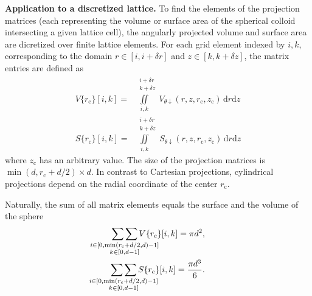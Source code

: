 \documentclass[10pt, a4paper, twocolumn]{article}
\begin{document}
\bigskip\noindent
\textbf{Application to a discretized lattice.}
To find the elements of the projection matrices (each representing the volume or surface area of the spherical colloid intersecting a given lattice cell), the angularly projected volume and surface area are dicretized over finite lattice elements.
For each grid element indexed by $i, k$, corresponding to the domain $r \in [i, i + \delta r]$ and $z \in [k, k + \delta z]$, the matrix entries are defined as
\begin{eqnarray}
    V\{r_{\text{c}}\}{[i, k]} = \! \iint \limits_{i, k}^{\quad \substack{i+\delta r\\ k+\delta z}} \! V_{\theta \downarrow} (r, z, r_{\text{c}}, z_{\text{c}})\, \text{d}r \text{d}z
    \\
    S\{r_{\text{c}}\}{[i, k]} = \! \iint \limits_{i, k}^{\quad \substack{i+\delta r\\ k+\delta z}} \! S_{\theta \downarrow} (r, z, r_{\text{c}}, z_{\text{c}})\, \text{d}r \text{d}z
\end{eqnarray}
where $z_{\text{c}}$ has an arbitrary value.
The size of the projection matrices is $\min(d, r_{\text{c}} + d/2) \times d$.
In contrast to Cartesian projections, cylindrical projections depend on the radial coordinate of the center $r_{\text{c}}$.

Naturally, the sum of all matrix elements equals the surface and the volume of the sphere
\begin{eqnarray*}
    \mathop{\sum\sum}_{\mathclap{\substack{i \in [0, \min(r_{\text{c}}+d/2,d)-1] \\ k \in [0, d-1]}}}  V\{r_{\text{c}}\}{[i, k]} = \pi d^2,
    \\
    \mathop{\sum\sum}_{\mathclap{\substack{i \in [0, \min(r_{\text{c}}+d/2,d)-1] \\ k \in [0, d-1]}}}  S\{r_{\text{c}}\}{[i, k]} = \frac{\pi d^3}{6} .
\end{eqnarray*}
\end{document}
